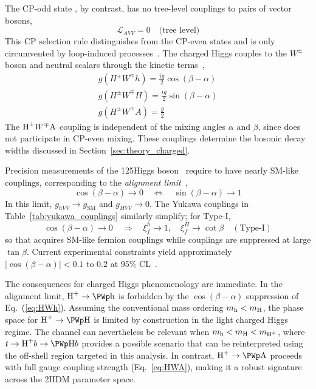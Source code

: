 The CP-odd state \PA, by contrast, has no tree-level couplings to pairs of vector bosons,
\begin{equation}
\mathcal{L}_{AVV} = 0 \quad \text{(tree level)}
\label{eq:A_no_VV}
\end{equation}
This CP selection rule distinguishes \PA from the CP-even states and is only circumvented by loop-induced processes~\cite{Gunion:1990dt}. The charged Higgs \PHpm couples to the $W^\pm$ boson and neutral scalars through the kinetic terms~\cite{Branco:2011iw},
\begin{gather}
g(H^\pm W^\mp h) = \frac{ig}{2} \cos(\beta - \alpha) \label{eq:HWh} \\
g(H^\pm W^\mp H) = \frac{ig}{2} \sin(\beta - \alpha) \label{eq:HWH} \\
g(H^\pm W^\mp A) = \frac{g}{2} \label{eq:HWA}
\end{gather}
The $\text{H}^{\pm} W^\mp \text{A}$ coupling is independent of the mixing angles $\alpha$ and $\beta$, since \PA does not participate in CP-even mixing. These couplings determine the bosonic decay widths discussed in Section~\ref{sec:theory_charged}.

Precision measurements of the 125\GeV Higgs boson~\cite{ATLAS:2012yda,CMS:2012qbp,ATLAS:2022vkf,CMS:2022dwd} require \Ph to have nearly SM-like couplings, corresponding to the \emph{alignment limit}~\cite{Branco:2011iw},
\begin{equation}
\cos(\beta - \alpha) \to 0 \quad \Leftrightarrow \quad \sin(\beta - \alpha) \to 1
\label{eq:alignment}
\end{equation}
In this limit, $g_{hVV} \to g_{\text{SM}}$ and $g_{HVV} \to 0$. The Yukawa couplings in Table~\ref{tab:yukawa_couplings} similarly simplify; for Type-I,
\begin{equation}
\cos(\beta - \alpha) \to 0 \quad \Rightarrow \quad \xi_f^h \to 1, \quad \xi_f^H \to \cot\beta \quad (\text{Type-I})
\end{equation}
so that \Ph acquires SM-like fermion couplings while \PH couplings are suppressed at large $\tan\beta$. Current experimental constraints yield approximately $|\cos(\beta - \alpha)| < 0.1$ to $0.2$ at 95\% CL~\cite{ATLAS:2022vkf,CMS:2022dwd}.

The consequences for charged Higgs phenomenology are immediate. In the alignment limit, $\PHp \to \PWp \Ph$ is forbidden by the $\cos(\beta - \alpha)$ suppression of Eq.~(\ref{eq:HWh}). Assuming the conventional mass ordering $m_{\text{h}} < m_{\text{H}}$, the phase space for $\PHp \to \PWp \PH$ is limited by construction in the light charged Higgs regime. The channel can nevertheless be relevant when $m_{\text{h}} < m_{\text{H}} < m_{\text{H}^+}$, where $t \to \PHp b \to \PWp \PH b$ provides a possible scenario that can be reinterpreted using the off-shell region targeted in this analysis. In contrast, $\PHp \to \PWp \PA$ proceeds with full gauge coupling strength (Eq.~\ref{eq:HWA}), making it a robust signature across the 2HDM parameter space.

